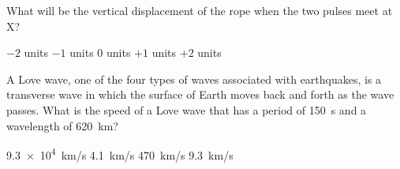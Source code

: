 \documentclass[answers]{exam}
\begin{document}
\begin{questions}
\question \label{YdeyW}
What will be the vertical displacement of the rope when the two pulses meet at X?

\begin{randomizechoices}[norandomize]
    \choice $-2$ units
    \choice $-1$ units
    \choice $0$ units
    \correctchoice $+1$ units
    \choice $+2$ units
\end{randomizechoices}



\question
A Love wave, one of the four types of waves associated with earthquakes, is a transverse wave in which the surface of Earth moves back and forth as the wave passes. What is the speed of a Love wave that has a period of \SI{150}{s} and a wavelength of \SI{620}{km}?

\begin{randomizechoices}
    \choice \SI{9.3e4}{km/s}
    \correctchoice \SI{4.1}{km/s}
    \choice \SI{470}{km/s}
    \choice \SI{9.3}{km/s}
\end{randomizechoices}





\end{questions}
\end{document}
